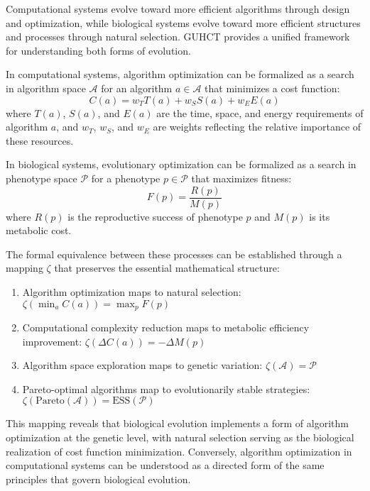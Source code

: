 \documentclass[11pt,a4paper]{article}
\makeatletter
\renewenvironment{proof}[1][\proofname]{\par
  \pushQED{\qed}%
  \normalfont \topsep6\p@\@plus6\p@\relax
  \trivlist
  \item[\hskip\labelsep
        \itshape
    #1\@addpunct{.}]\ignorespaces
}{%
  \popQED\endtrivlist\@endpefalse
}
\makeatother
\begin{document}
\begin{proof}
Computational systems evolve toward more efficient algorithms through design and optimization, while biological systems evolve toward more efficient structures and processes through natural selection. GUHCT provides a unified framework for understanding both forms of evolution.

In computational systems, algorithm optimization can be formalized as a search in algorithm space $\mathcal{A}$ for an algorithm $a \in \mathcal{A}$ that minimizes a cost function:
\begin{equation}
C(a) = w_T T(a) + w_S S(a) + w_E E(a)
\end{equation}
where $T(a)$, $S(a)$, and $E(a)$ are the time, space, and energy requirements of algorithm $a$, and $w_T$, $w_S$, and $w_E$ are weights reflecting the relative importance of these resources.

In biological systems, evolutionary optimization can be formalized as a search in phenotype space $\mathcal{P}$ for a phenotype $p \in \mathcal{P}$ that maximizes fitness:
\begin{equation}
F(p) = \frac{R(p)}{M(p)}
\end{equation}
where $R(p)$ is the reproductive success of phenotype $p$ and $M(p)$ is its metabolic cost.

The formal equivalence between these processes can be established through a mapping $\zeta$ that preserves the essential mathematical structure:
\begin{enumerate}
    \item Algorithm optimization maps to natural selection: $\zeta(\min_a C(a)) = \max_p F(p)$
    \item Computational complexity reduction maps to metabolic efficiency improvement: $\zeta(\Delta C(a)) = -\Delta M(p)$
    \item Algorithm space exploration maps to genetic variation: $\zeta(\mathcal{A}) = \mathcal{P}$
    \item Pareto-optimal algorithms map to evolutionarily stable strategies: $\zeta(\text{Pareto}(\mathcal{A})) = \text{ESS}(\mathcal{P})$
\end{enumerate}

This mapping reveals that biological evolution implements a form of algorithm optimization at the genetic level, with natural selection serving as the biological realization of cost function minimization. Conversely, algorithm optimization in computational systems can be understood as a directed form of the same principles that govern biological evolution.


\end{proof}
\end{document}
